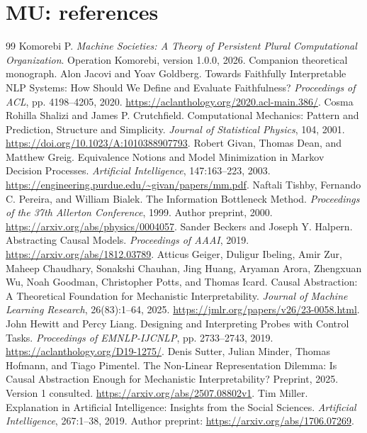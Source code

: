 \documentclass[11pt,oneside,openany]{book}
\numberwithin{equation}{section}
\begin{document}
\chapter{MU: references}
\begin{thebibliography}{99}\fontsize{9.5}{11}\selectfont
\setlength{\itemsep}{3pt}\setlength{\parsep}{0pt}\setlength{\parskip}{0pt}
 Komorebi P. \emph{Machine Societies: A Theory of Persistent Plural Computational Organization}. Operation Komorebi, version 1.0.0, 2026. Companion theoretical monograph.
 Alon Jacovi and Yoav Goldberg. Towards Faithfully Interpretable NLP Systems: How Should We Define and Evaluate Faithfulness? \emph{Proceedings of ACL}, pp. 4198--4205, 2020. \url{https://aclanthology.org/2020.acl-main.386/}.
 Cosma Rohilla Shalizi and James P. Crutchfield. Computational Mechanics: Pattern and Prediction, Structure and Simplicity. \emph{Journal of Statistical Physics}, 104, 2001. \url{https://doi.org/10.1023/A:1010388907793}.
 Robert Givan, Thomas Dean, and Matthew Greig. Equivalence Notions and Model Minimization in Markov Decision Processes. \emph{Artificial Intelligence}, 147:163--223, 2003. \url{https://engineering.purdue.edu/~givan/papers/mm.pdf}.
 Naftali Tishby, Fernando C. Pereira, and William Bialek. The Information Bottleneck Method. \emph{Proceedings of the 37th Allerton Conference}, 1999. Author preprint, 2000. \url{https://arxiv.org/abs/physics/0004057}.
 Sander Beckers and Joseph Y. Halpern. Abstracting Causal Models. \emph{Proceedings of AAAI}, 2019. \url{https://arxiv.org/abs/1812.03789}.
 Atticus Geiger, Duligur Ibeling, Amir Zur, Maheep Chaudhary, Sonakshi Chauhan, Jing Huang, Aryaman Arora, Zhengxuan Wu, Noah Goodman, Christopher Potts, and Thomas Icard. Causal Abstraction: A Theoretical Foundation for Mechanistic Interpretability. \emph{Journal of Machine Learning Research}, 26(83):1--64, 2025. \url{https://jmlr.org/papers/v26/23-0058.html}.
 John Hewitt and Percy Liang. Designing and Interpreting Probes with Control Tasks. \emph{Proceedings of EMNLP-IJCNLP}, pp. 2733--2743, 2019. \url{https://aclanthology.org/D19-1275/}.
 Denis Sutter, Julian Minder, Thomas Hofmann, and Tiago Pimentel. The Non-Linear Representation Dilemma: Is Causal Abstraction Enough for Mechanistic Interpretability? Preprint, 2025. Version 1 consulted. \url{https://arxiv.org/abs/2507.08802v1}.
 Tim Miller. Explanation in Artificial Intelligence: Insights from the Social Sciences. \emph{Artificial Intelligence}, 267:1--38, 2019. Author preprint: \url{https://arxiv.org/abs/1706.07269}.

\end{thebibliography}
\end{document}
